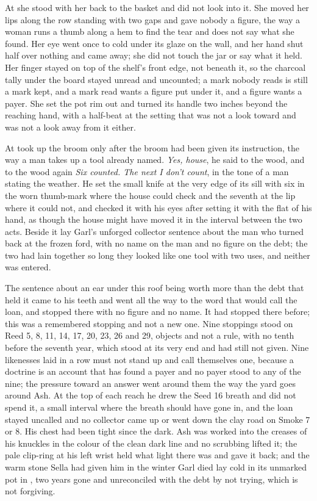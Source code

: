 At  she stood with her back to the basket and did not look into it. She moved her lips along the row standing with two gaps and gave nobody a figure, the way a woman runs a thumb along a hem to find the tear and does not say what she found. Her eye went once to  cold under its glaze on the wall, and her hand shut half over nothing and came away; she did not touch the jar or say what it held. Her finger stayed on top of the shelf's front edge, not beneath it, so the charcoal tally under the board stayed unread and uncounted; a mark nobody reads is still a mark kept, and a mark read wants a figure put under it, and a figure wants a payer. She set the pot rim out and turned its handle two inches beyond the reaching hand, with a half-beat at the setting that was not a look toward  and was not a look away from it either.

\scenebreak

At   took up the broom only after the broom had been given its instruction, the way a man takes up a tool already named. \emph{Yes, house}, he said to the wood, and to the wood again \emph{Six counted. The next I don’t count}, in the tone of a man stating the weather. He set the small knife at the very edge of its sill with six in the worn thumb-mark where the house could check and the seventh at the lip where it could not, and checked it with his eyes after setting it with the flat of his hand, as though the house might have moved it in the interval between the two acts. Beside it lay Garl's unforged collector sentence about the man who turned back at the frozen ford, with no name on the man and no figure on the debt; the two had lain together so long they looked like one tool with two uses, and neither was entered.

The sentence about an ear under this roof being worth more than the debt that held it came to his teeth and went all the way to the word that would call the loan, and stopped there with no figure and no name. It had stopped there before; this was a remembered stopping and not a new one. Nine stoppings stood on Reed 5, 8, 11, 14, 17, 20, 23, 26 and 29, objects and not a rule, with no tenth before the seventh year, which stood at its very end and had still not given. Nine likenesses laid in a row must not stand up and call themselves one, because a doctrine is an account that has found a payer and no payer stood to any of the nine; the pressure toward an answer went around them the way the yard goes around Ash. At the top of each reach he drew the Seed 16 breath and did not spend it, a small interval where the breath should have gone in, and the loan stayed uncalled and no collector came up or went down the clay road on Smoke 7 or 8. His chest had been tight since the dark. Ash was worked into the creases of his knuckles in the colour of the clean dark line and no scrubbing lifted it; the pale clip-ring at his left wrist held what light there was and gave it back; and the warm stone Sella had given him in the winter Garl died lay cold in its unmarked pot in , two years gone and unreconciled with the debt by not trying, which is not forgiving.

